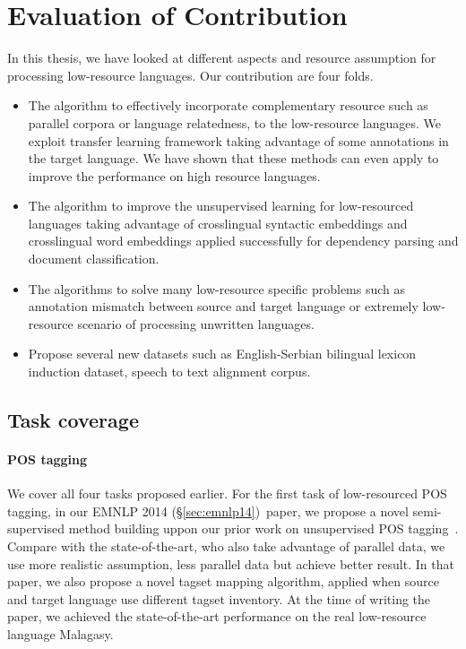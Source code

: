 \documentclass[12pt,twoside,final,hidelinks]{ltthesis}
\theoremstyle{definition}
\newcommand\emnlpiv{EMNLP 2014 (\S\ref{sec:emnlp14})}
\begin{document}
\section{Evaluation of Contribution}
\label{sec:evaluation_contribution}
In this thesis, we have looked at different aspects and resource assumption for processing low-resource languages. Our contribution are four folds. 
\begin{itemize}
\item The algorithm to effectively incorporate complementary resource such as parallel corpora or language relatedness, to the low-resource languages.
We exploit transfer learning framework taking advantage of some annotations in the target language. We have shown that these methods can even apply to improve 
the performance on high resource languages. 
\item The algorithm to improve the unsupervised learning for low-resourced languages taking advantage of crosslingual syntactic embeddings and crosslingual 
word embeddings applied successfully for dependency parsing and document classification. 
\item The algorithms to solve many low-resource specific problems such as annotation mismatch between source and target language or extremely low-resource scenario of processing unwritten languages.
\item Propose several new datasets such as English-Serbian bilingual lexicon induction dataset, speech to text alignment corpus. 
\end{itemize}

\subsection{Task coverage}
\paragraph{POS tagging} We cover all four tasks proposed earlier. For the first task of low-resourced POS tagging, in our \emnlpiv\ paper, we propose a novel semi-supervised method building 
uppon our prior work on unsupervised POS tagging~\cite{duongIJCNLP,Duongacl13}. Compare with 
the state-of-the-art, who also take advantage of parallel data, we use more realistic assumption, less parallel data but achieve better result. 
In that paper, we also propose a novel tagset mapping algorithm, applied when source and target language use different tagset inventory. At the 
time of writing the paper, we achieved the state-of-the-art performance on the real low-resource language Malagasy. 
\end{document}
